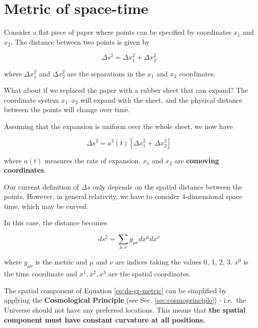 \documentclass[]{book}
\begin{document}
\section{Metric of space-time}\label{sec:metric}

Consider a flat piece of paper where points can be specified by
coordinates \(x_1\) and \(x_2\). The distance between two points is
given by

\begin{equation}
\Delta s^2 = \Delta x_{1}^{2} + \Delta x_{2}^{2}
\label{eq:dist01}
\end{equation}

where \(\Delta x_{1}^{2}\) and \(\Delta x_{2}^{2}\) are the separations
in the \(x_1\) and \(x_2\) coordinates.

What about if we replaced the paper with a rubber sheet that can expand?
The coordinate system \(x_1\)--\(x_2\) will expand with the sheet, and
the physical distance between the points will change over time.

Assuming that the expansion is uniform over the whole sheet, we now have

\begin{equation}
\Delta s^2 = a^2(t)\left[\Delta x_{1}^{2} + \Delta x_{2}^{2}\right]
\label{eq:comoving01}
\end{equation}

where \(a(t)\) measures the rate of expansion. \(x_1\) and \(x_2\) are
\textbf{comoving coordinates}.

Our current definition of \(\Delta s\) only depends on the spatial
distance between the points. However, in general relativity, we have to
consider 4-dimensional space time, which may be curved.

In this case, the distance becomes

\begin{equation}
ds^2 = \sum_{\mu, \nu} g_{\mu\nu} dx^{\mu} dx^{\nu}
\label{eq:ds-gr-metric}
\end{equation}

where \(g_{\mu\nu}\) is the metric and \(\mu\) and \(\nu\) are indices
taking the values 0, 1, 2, 3. \(x^{0}\) is the time coordinate and
\(x^{1}, x^{2}, x^{3}\) are the spatial coordinates.

The spatial component of Equation \eqref{eq:ds-gr-metric} can be
simplified by applying the \textbf{Cosmological Principle} (see Sec.
\ref{sec:cosmoprinciple}) - i.e.~the Universe should not have any
preferred locations. This means that \textbf{the spatial component must
have constant curvature at all positions.}
\end{document}
